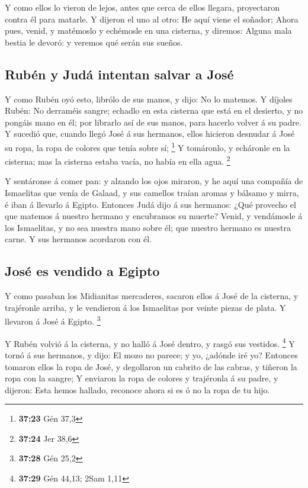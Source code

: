  Y como ellos lo vieron de lejos, antes que cerca de ellos
llegara, proyectaron contra él para matarle.  Y dijeron el
uno al otro: He aquí viene el soñador;  Ahora pues, venid,
y matémoslo y echémosle en una cisterna, y diremos: Alguna mala bestia
le devoró: y veremos qué serán sus sueños.

\hypertarget{rubuxe9n-y-juduxe1-intentan-salvar-a-josuxe9}{%
\subsection{Rubén y Judá intentan salvar a
José}\label{rubuxe9n-y-juduxe1-intentan-salvar-a-josuxe9}}

 Y como Rubén oyó esto, librólo de sus manos, y dijo: No lo
matemos.  Y díjoles Rubén: No derraméis sangre; echadlo en
esta cisterna que está en el desierto, y no pongáis mano en él; por
librarlo así de sus manos, para hacerlo volver á su padre. 
Y sucedió que, cuando llegó José á sus hermanos, ellos hicieron desnudar
á José su ropa, la ropa de colores que tenía sobre sí; \footnote{\textbf{37:23}
  Gén 37,3}  Y tomáronlo, y echáronle en la cisterna; mas
la cisterna estaba vacía, no había en ella agua. \footnote{\textbf{37:24}
  Jer 38,6}

 Y sentáronse á comer pan: y alzando los ojos miraron, y he
aquí una compañía de Ismaelitas que venía de Galaad, y sus camellos
traían aromas y bálsamo y mirra, é iban á llevarlo á Egipto.
 Entonces Judá dijo á sus hermanos: ¿Qué provecho el que
matemos á nuestro hermano y encubramos su muerte?  Venid, y
vendámosle á los Ismaelitas, y no sea nuestra mano sobre él; que nuestro
hermano es nuestra carne. Y sus hermanos acordaron con él.

\hypertarget{josuxe9-es-vendido-a-egipto}{%
\subsection{José es vendido a
Egipto}\label{josuxe9-es-vendido-a-egipto}}

 Y como pasaban los Midianitas mercaderes, sacaron ellos á
José de la cisterna, y trajéronle arriba, y le vendieron á los
Ismaelitas por veinte piezas de plata. Y llevaron á José á Egipto.
\footnote{\textbf{37:28} Gén 25,2}

 Y Rubén volvió á la cisterna, y no halló á José dentro, y
rasgó sus vestidos. \footnote{\textbf{37:29} Gén 44,13; 2Sam 1,11}
 Y tornó á sus hermanos, y dijo: El mozo no parece; y yo,
¿adónde iré yo?  Entonces tomaron ellos la ropa de José, y
degollaron un cabrito de las cabras, y tiñeron la ropa con la sangre;
 Y enviaron la ropa de colores y trajéronla á su padre, y
dijeron: Esta hemos hallado, reconoce ahora si es ó no la ropa de tu
hijo.

